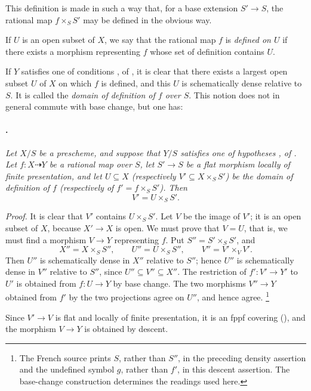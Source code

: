 This definition is made in such a way that, for a base extension
\(S'\to S\), the rational map \(f\times_S S'\) may be defined in the
obvious way.

If \(U\) is an open subset of \(X\), we say that the rational map
\(f\) is \emph{defined on \(U\)} if there exists a morphism
representing \(f\) whose set of definition contains \(U\).

%
If \(Y\) satisfies one of conditions ,  of , it is
clear that there exists a largest open subset \(U\) of \(X\) on
which \(f\) is defined, and this \(U\) is schematically dense
relative to \(S\). It is called the \emph{domain of definition of
\(f\) over \(S\)}. This notion does not in general commute with base change, but one
has:

\paragraph{.}
\textit{Let \(X/S\) be a prescheme, and suppose that \(Y/S\)
satisfies one of hypotheses ,  of . Let
\(f:X\dashrightarrow Y\) be a rational map over \(S\), let
\(S'\to S\) be a flat morphism locally of finite presentation, and
let \(U\subseteq X\) \textup{(}respectively \(V'\subseteq X\times_S S'\)\textup{)} be the domain of
definition of \(f\) \textup{(}respectively of \(f'=f\times_S S'\)\textup{)}. Then}
\[
  V'=U\times_S S'.
\]

\textit{Proof.}
It is clear that \(V'\) contains
\(U\times_S S'\). Let \(V\) be the image of \(V'\); it is an open
subset of \(X\), because \(X'\to X\) is open. We must prove that
\(V=U\), that is, we must find a morphism \(V\to Y\) representing
\(f\). Put \(S''=S'\times_S S'\), and
\[
  X''=X\times_S S'',\qquad
  U''=U\times_S S'',\qquad
  V''=V'\times_V V'.
\]
Then \(U''\) is schematically dense in \(X''\) relative to \(S''\);
hence \(U''\) is schematically dense in \(V''\) relative to
\(S''\), since \(U''\subseteq V''\subseteq X''\). The restriction
of \(f':V'\to Y'\) to \(U'\) is obtained from \(f:U\to Y\) by base
change. The two morphisms \(V''\to Y\) obtained from \(f'\) by the
two projections agree on \(U''\), and hence agree.\begingroup
\renewcommand{\thefootnote}{\ensuremath{\dagger}}\footnote{The
French source prints \(S\), rather than \(S''\), in the preceding
density assertion and the undefined symbol \(g\), rather than
\(f'\), in this descent assertion. The base-change construction
determines the readings used here.}
\addtocounter{footnote}{-1}
\endgroup Since \(V'\to V\) is flat and
locally of finite presentation, it is an fppf covering (), and the morphism \(V\to Y\) is obtained by descent.

